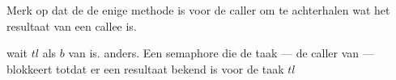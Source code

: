 Merk op dat de  de enige methode is voor de caller om te achterhalen wat het resultaat van een callee is.

\begin{functie}{wait $tl$}
	\functieresultaat{}  als $b$ van   is.  anders.
	\functieomschrijving
	Een semaphore die de taak --- de caller van  --- blokkeert totdat er een resultaat bekend is voor de taak
	$tl$
\end{functie}

